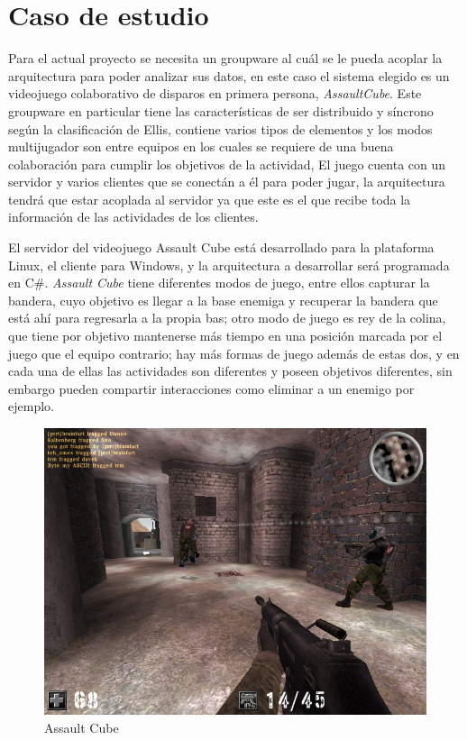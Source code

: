 \section{Caso de estudio}

Para el actual proyecto se necesita un groupware al cu\'al se le pueda acoplar la arquitectura para poder analizar sus datos, en este caso el sistema elegido es un videojuego colaborativo de disparos en primera persona, \textit{AssaultCube}. Este groupware en particular tiene las caracter\'isticas de ser distribuido y s\'incrono seg\'un la clasificaci\'on de Ellis\cite{ellis1991groupware}, contiene varios tipos de elementos y los modos multijugador son entre equipos en los cuales se requiere de una buena colaboraci\'on para cumplir los objetivos de la actividad, El juego cuenta con un servidor y varios clientes que se conect\'an a \'el para poder jugar, la arquitectura tendr\'a que estar acoplada al servidor ya que este es el que recibe toda la informaci\'on de las actividades de los clientes.

El servidor del videojuego Assault Cube est\'a desarrollado para la plataforma Linux, el cliente para Windows, y la arquitectura a desarrollar ser\'a programada en C\#. \textit{Assault Cube} tiene diferentes modos de juego, entre ellos capturar la bandera, cuyo objetivo es llegar a la base enemiga y recuperar la bandera que est\'a ah\'i para regresarla a la propia bas; otro modo de juego es rey de la colina, que tiene por objetivo mantenerse m\'as tiempo en una posici\'on marcada por el juego que el equipo contrario; hay m\'as formas de juego adem\'as de estas dos, y en cada una de ellas las actividades son diferentes y poseen objetivos diferentes, sin embargo pueden compartir interacciones como eliminar a un enemigo por ejemplo.

\begin{figure}[h!]
\centering
\includegraphics[scale=.15]{images/assaultcube}
\caption{Assault Cube}
\label{gw:asscb}
\end{figure}


